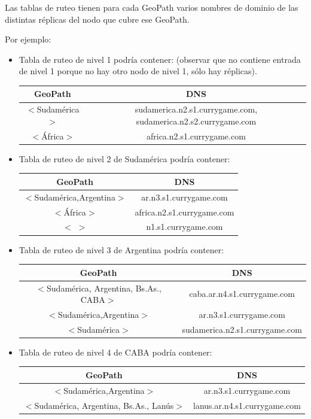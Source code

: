 Las tablas de ruteo tienen para cada GeoPath varios nombres de dominio de las distintas réplicas del nodo que cubre ese GeoPath.

Por ejemplo:
\begin{itemize}
	\item Tabla de ruteo de nivel 1 podría contener: (observar que no contiene entrada de nivel 1 porque no hay otro nodo de nivel 1, sólo hay réplicas).
	
	\begin{center}
	\begin{tabular}{| c | c |}
	\hline
	GeoPath & DNS \\
	\hline
	$<$Sudamérica$>$ & sudamerica.n2.s1.currygame.com, sudamerica.n2.s2.currygame.com\\
	\hline
	$<$África$>$ & africa.n2.s1.currygame.com\\
	\hline
	\end{tabular}
	\end{center}
	
	\item Tabla de ruteo de nivel 2 de Sudamérica podría contener:

	\begin{center}
	\begin{tabular}{| c | c |}
	\hline
	GeoPath & DNS \\
	\hline
	$<$Sudamérica,Argentina$>$ &  ar.n3.s1.currygame.com\\
	\hline
	$<$África$>$ & africa.n2.s1.currygame.com\\
	\hline
    $<$ $>$ &  n1.s1.currygame.com\\
	\hline
	\end{tabular}
	\end{center}
	
	\item Tabla de ruteo de nivel 3 de Argentina podría contener:
	\begin{center}
	\begin{tabular}{| c | c |}
	\hline
	GeoPath & DNS \\
	\hline
	$<$Sudamérica, Argentina, Bs.As., CABA$>$ & caba.ar.n4.s1.currygame.com\\
	\hline
	$<$Sudamérica,Argentina$>$ &  ar.n3.s1.currygame.com\\
	\hline
	$<$Sudamérica$>$ &  sudamerica.n2.s1.currygame.com\\
	\hline
	\end{tabular}
	\end{center}
	
	\item Tabla de ruteo de nivel 4 de CABA podría contener:
	\begin{center}
	\begin{tabular}{| c | c |}
	\hline
	GeoPath & DNS \\
	\hline
	$<$Sudamérica,Argentina$>$ &  ar.n3.s1.currygame.com\\
	\hline
	$<$Sudamérica, Argentina, Bs.As., Lanús$>$ & lanus.ar.n4.s1.currygame.com\\
	\hline
	\end{tabular}
	\end{center}

\end{itemize}


